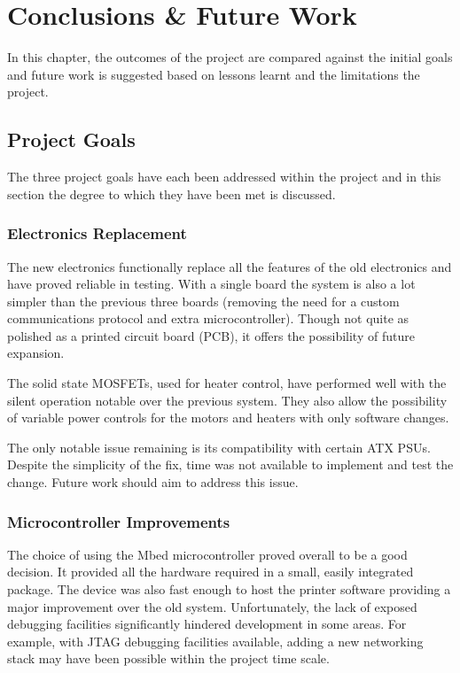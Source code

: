 \chapter{Conclusions \& Future Work}
	
	\label{sec:conclusions}
	
	In this chapter, the outcomes of the project are compared against the initial
	goals and future work is suggested based on lessons learnt and the limitations
	the project.
	
	\section{Project Goals}
		
		The three project goals have each been addressed within the project and in
		this section the degree to which they have been met is discussed.
		
		\subsection{Electronics Replacement}
			
			The new electronics functionally replace all the features of the old
			electronics and have proved reliable in testing.  With a single board the
			system is also a lot simpler than the previous three boards (removing the
			need for a custom communications protocol and extra microcontroller).
			Though not quite as polished as a printed circuit board (PCB), it offers
			the possibility of future expansion.
			
			The solid state MOSFETs, used for heater control, have performed well with
			the silent operation notable over the previous system. They also allow the
			possibility of variable power controls for the motors and heaters with
			only software changes.
			
			The only notable issue remaining is its compatibility with certain ATX
			PSUs. Despite the simplicity of the fix, time was not available to
			implement and test the change. Future work should aim to address this
			issue.
		
		\subsection{Microcontroller Improvements}
			
			The choice of using the Mbed microcontroller proved overall to be a good
			decision. It provided all the hardware required in a small, easily
			integrated package. The device was also fast enough to host the printer
			software providing a major improvement over the old system. Unfortunately,
			the lack of exposed debugging facilities significantly hindered
			development in some areas. For example, with JTAG debugging facilities
			available, adding a new networking stack may have been possible within the
			project time scale.
			
